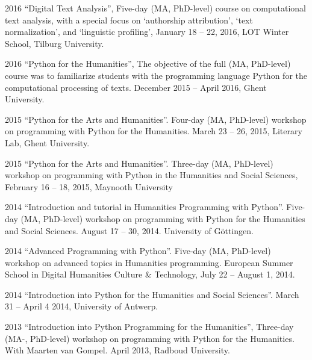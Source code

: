 \documentclass[12pt,letterpaper]{report}
\begin{document}
\begin{tablist}
  \item[2016] \tab{}``Digital Text Analysis'', Five-day (MA, PhD-level) course on
    computational text analysis, with a special focus on `authorship attribution', `text
    normalization', and `linguistic profiling', January 18 -- 22, 2016, LOT Winter School,
    Tilburg University.
  \item[2016] \tab{}``Python for the Humanities'', The objective of the full (MA,
    PhD-level) course was to familiarize students with the programming language Python for
    the computational processing of texts. December 2015 -- April 2016, Ghent University. 
  \item[2015] \tab{}``Python for the Arts and Humanities''. Four-day (MA, PhD-level)
    workshop on programming with Python for the Humanities. March 23 -- 26, 2015, Literary
    Lab, Ghent University.
  \item[2015] \tab{}``Python for the Arts and Humanities''. Three-day (MA, PhD-level)
    workshop on programming with Python in the Humanities and Social Sciences, February 16
    -- 18, 2015, Maynooth University
  \item[2014] \tab{}``Introduction and tutorial in Humanities Programming with Python''.
    Five-day (MA, PhD-level) workshop on programming with Python for the Humanities and
    Social Sciences. August 17 -- 30, 2014. University of Göttingen. 
  \item[2014] \tab{}``Advanced Programming with Python''. Five-day (MA, PhD-level)
    workshop on advanced topics in Humanities programming. European Summer School in
    Digital Humanities Culture \& Technology, July 22 -- August 1, 2014. 
  \item[2014] \tab{}``Introduction into Python for the Humanities and Social Sciences''.
    March 31 -- April 4 2014, University of Antwerp. 
  \item[2013] \tab{}``Introduction into Python Programming for the Humanities'', Three-day
    (MA-, PhD-level) workshop on programming with Python for the Humanities. With
    Maarten van Gompel. April 2013, Radboud University.
  \end{tablist}
\end{document}
